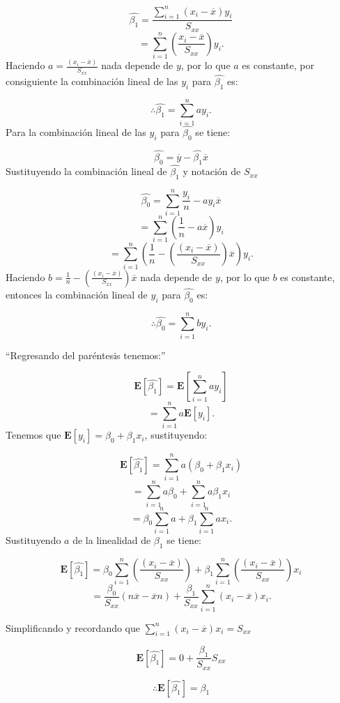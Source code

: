 \documentclass[a4paper,oneside,openany]{book}
\begin{document}
\[\hat{\beta_{1}}=\frac{\sum_{i=1}^{n}(x_{i}-\overline{x})y_{i}}{S_{xx}}\]
\[=\sum_{i=1}^{n}\left(\frac{x_{i}-\overline{x}}{S_{xx}}\right)y_{i}.\]
Haciendo \(a=\frac{(x_{i}-\overline{x})}{S_{xx}}\) nada depende de
\(y\), por lo que \(a\) es constante, por consiguiente la combinación
lineal de las \(y_{i}\) para \(\hat{\beta_{1}}\) es:

\[\therefore \hat{\beta_{1}}=\sum_{i=1}^{n}ay_{i}.\] Para la combinación
lineal de las \(y_{i}\) para \(\hat{\beta_{0}}\) se tiene:

\[\hat{\beta_{0}}=\overline{y}-\hat{\beta_{1}}\overline{x}\]
Sustituyendo la combinación lineal de \(\hat{\beta_{1}}\) y notación de
\(S_{xx}\)

\[\hat{\beta_{0}}=\sum_{i=1}^{n}\frac{y_{i}}{n}-ay_{i}\overline{x}\]
\[=\sum_{i=1}^{n}(\frac{1}{n}-a\overline{x})y_{i}\]
\[=\sum_{i=1}^{n}\left(\frac{1}{n}-\left(\frac{(x_{i}-\overline{x})}{S_{xx}}\right)\overline{x}\right)y_{i}. \]
Haciendo
\(b=\frac{1}{n}-\left(\frac{(x_{i}-\overline{x})}{S_{xx}}\right)\overline{x}\)
nada depende de \(y\), por lo que \(b\) es constante, entonces la
combinación lineal de \(y_{i}\) para \(\hat{\beta_{0}}\) es:

\[\therefore \hat{\beta_{0}}=\sum_{i=1}^{n}by_{i}.\]

``Regresando del paréntesis tenemos:''

\[\mathbf{E}\left[\hat{\beta_{1}}\right]=\mathbf{E}\left[\sum_{i=1}^{n}ay_{i}\right]\]
\[=\sum_{i=1}^{n}a\mathbf{E}[y_{i}].\] Tenemos que
\(\mathbf{E}[y_{i}]=\beta_{0}+\beta_{1}x_{i}\), sustituyendo:

\[\mathbf{E}\left[\hat{\beta_{1}}\right]=\sum_{i=1}^{n}a(\beta_{0}+\beta_{1}x_{i})\]
\[=\sum_{i=1}^{n}a\beta_{0}+\sum_{i=1}^{n}a\beta_{1}x_{i}\]
\[=\beta_{0}\sum_{i=1}^{n}a+\beta_{1}\sum_{i=1}^{n}ax_{i}.\]
Sustituyendo \(a\) de la linealidad de \(\beta_{1}\) se tiene:

\[\mathbf{E}\left[\hat{\beta_{1}}\right]=\beta_{0}\sum_{i=1}^{n}\left(\frac{(x_{i}-\overline{x})}{S_{xx}}\right)+\beta_{1}\sum_{i=1}^{n}\left(\frac{(x_{i}-\overline{x})}{S_{xx}}\right)x_{i}\]
\[=\frac{\beta_{0}}{S_{xx}}(n\overline{x}-\overline{x}n)+\frac{\beta_{1}}{S_{xx}}\sum_{i=1}^{n}(x_{i}-\overline{x})x_{i}.\]

Simplificando y recordando que
\(\sum_{i=1}^{n}(x_{i}-\overline{x})x_{i}=S_{xx}\)

\[\mathbf{E}\left[\hat{\beta_{1}}\right]=0+\frac{\beta_{1}}{S_{xx}}S_{xx}\]

\[\therefore \mathbf{E}\left[\hat{\beta_{1}}\right]=\beta_{1}\]
\end{document}
